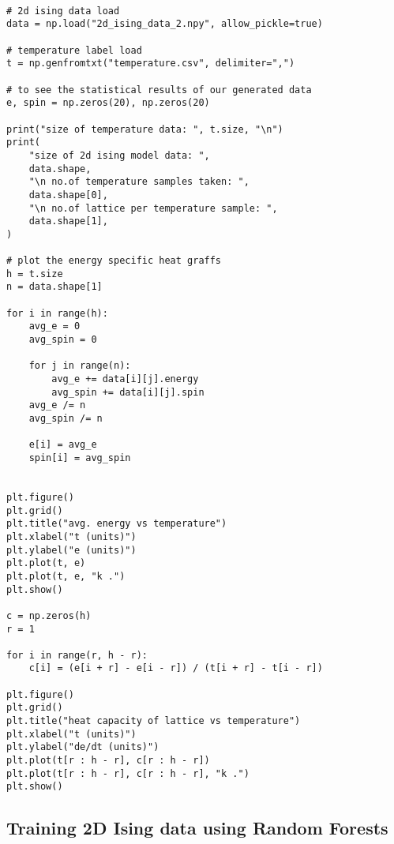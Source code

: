 \begin{verbatim}

# 2d ising data load
data = np.load("2d_ising_data_2.npy", allow_pickle=true)

# temperature label load
t = np.genfromtxt("temperature.csv", delimiter=",")

# to see the statistical results of our generated data
e, spin = np.zeros(20), np.zeros(20)

print("size of temperature data: ", t.size, "\n")
print(
    "size of 2d ising model data: ",
    data.shape,
    "\n no.of temperature samples taken: ",
    data.shape[0],
    "\n no.of lattice per temperature sample: ",
    data.shape[1],
)

# plot the energy specific heat graffs
h = t.size
n = data.shape[1]

for i in range(h):
    avg_e = 0
    avg_spin = 0

    for j in range(n):
        avg_e += data[i][j].energy
        avg_spin += data[i][j].spin
    avg_e /= n
    avg_spin /= n

    e[i] = avg_e
    spin[i] = avg_spin


plt.figure()
plt.grid()
plt.title("avg. energy vs temperature")
plt.xlabel("t (units)")
plt.ylabel("e (units)")
plt.plot(t, e)
plt.plot(t, e, "k .")
plt.show()

c = np.zeros(h)
r = 1

for i in range(r, h - r):
    c[i] = (e[i + r] - e[i - r]) / (t[i + r] - t[i - r])

plt.figure()
plt.grid()
plt.title("heat capacity of lattice vs temperature")
plt.xlabel("t (units)")
plt.ylabel("de/dt (units)")
plt.plot(t[r : h - r], c[r : h - r])
plt.plot(t[r : h - r], c[r : h - r], "k .")
plt.show()
\end{verbatim}

\subsection{Training 2D Ising data using Random Forests}

